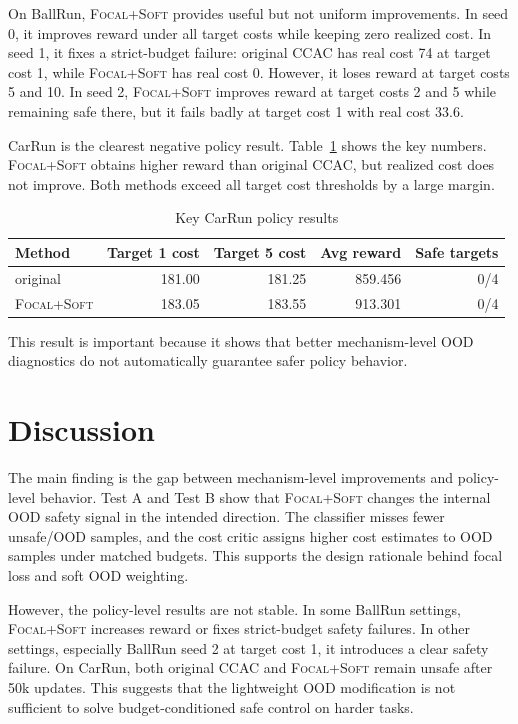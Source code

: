 \documentclass[11pt,a4paper]{article}
\newcommand{\ccac}{\textsc{CCAC}}
\newcommand{\ours}{\textsc{Focal+Soft}}
\begin{document}
On BallRun, \ours{} provides useful but not uniform improvements. In seed 0,
it improves reward under all target costs while keeping zero realized cost. In
seed 1, it fixes a strict-budget failure: original \ccac{} has real cost 74 at
target cost 1, while \ours{} has real cost 0. However, it loses reward at
target costs 5 and 10. In seed 2, \ours{} improves reward at target costs 2 and
5 while remaining safe there, but it fails badly at target cost 1 with real
cost 33.6.

CarRun is the clearest negative policy result. Table~\ref{tab:carrun-policy}
shows the key numbers. \ours{} obtains higher reward than original \ccac{}, but
realized cost does not improve. Both methods exceed all target cost thresholds
by a large margin.

\begin{table}[H]
  \centering
  \caption{Key CarRun policy results}
  \label{tab:carrun-policy}
  \begin{tabular}{lrrrr}
    \toprule
    Method & Target 1 cost & Target 5 cost & Avg reward & Safe targets \\
    \midrule
    original & 181.00 & 181.25 & 859.456 & 0/4 \\
    \ours & 183.05 & 183.55 & 913.301 & 0/4 \\
    \bottomrule
  \end{tabular}
\end{table}

This result is important because it shows that better mechanism-level OOD
diagnostics do not automatically guarantee safer policy behavior.

\section{Discussion}

The main finding is the gap between mechanism-level improvements and
policy-level behavior. Test A and Test B show that \ours{} changes the internal
OOD safety signal in the intended direction. The classifier misses fewer
unsafe/OOD samples, and the cost critic assigns higher cost estimates to OOD
samples under matched budgets. This supports the design rationale behind focal
loss and soft OOD weighting.

However, the policy-level results are not stable. In some BallRun settings,
\ours{} increases reward or fixes strict-budget safety failures. In other
settings, especially BallRun seed 2 at target cost 1, it introduces a clear
safety failure. On CarRun, both original \ccac{} and \ours{} remain unsafe
after 50k updates. This suggests that the lightweight OOD modification is not
sufficient to solve budget-conditioned safe control on harder tasks.
\end{document}
